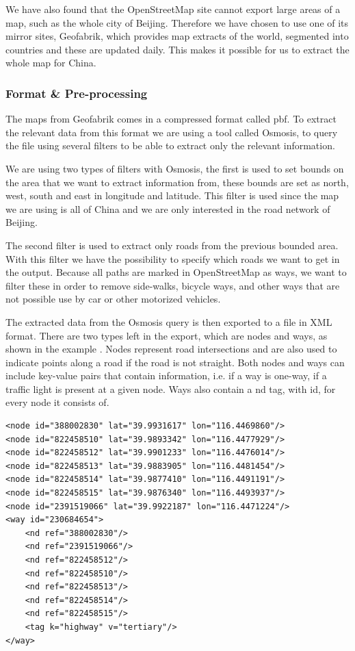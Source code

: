 We have also found that the OpenStreetMap site cannot export large areas of a map, such as the whole city of Beijing. Therefore we have chosen to use one of its mirror sites, Geofabrik\cite{geofabrik}, which provides map extracts of the world, segmented into countries and these are updated daily. This makes it possible for us to extract the whole map for China.

\subsubsection{Format \& Pre-processing}
\label{chap:FormatPre-processing}
The maps from Geofabrik comes in a compressed format called pbf. To extract the relevant data from this format we are using a tool called Osmosis, to query the file using several filters to be able to extract only the relevant information.

We are using two types of filters with Osmosis, the first is used to set bounds on the area that we want to extract information from, these bounds are set as north, west, south and east in longitude and latitude. This filter is used since the map we are using is all of China and we are only interested in the road network of Beijing.

The second filter is used to extract only roads from the previous bounded area. With this filter we have the possibility to specify which roads we want to get in the output. Because all paths are marked in OpenStreetMap as ways, we want to filter these in order to remove side-walks, bicycle ways, and other ways that are not possible use by car or other motorized vehicles.

The extracted data from the Osmosis query is then exported to a file in XML format. There are two types left in the export, which are nodes and ways, as shown in the example . Nodes represent road intersections and are also used to indicate points along a road if the road is not straight. Both nodes and ways can include key-value pairs that contain information, i.e. if a way is one-way, if a traffic light is present at a given node. Ways also contain a nd tag, with id, for every node it consists of.

\begin{lstlisting}[style=Java, caption=An simplified example of a road and its related nodes in XML, label=wayexample]
<node id="388002830" lat="39.9931617" lon="116.4469860"/>
<node id="822458510" lat="39.9893342" lon="116.4477929"/>
<node id="822458512" lat="39.9901233" lon="116.4476014"/>
<node id="822458513" lat="39.9883905" lon="116.4481454"/>
<node id="822458514" lat="39.9877410" lon="116.4491191"/>
<node id="822458515" lat="39.9876340" lon="116.4493937"/>
<node id="2391519066" lat="39.9922187" lon="116.4471224"/>
<way id="230684654">
    <nd ref="388002830"/>
    <nd ref="2391519066"/>
    <nd ref="822458512"/>
    <nd ref="822458510"/>
    <nd ref="822458513"/>
    <nd ref="822458514"/>
    <nd ref="822458515"/>
    <tag k="highway" v="tertiary"/>
</way>
\end{lstlisting}

